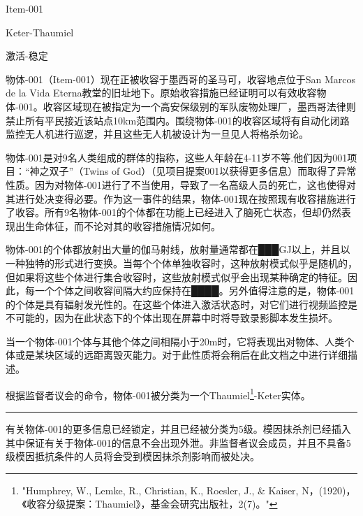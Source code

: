 Item-001

Keter-Thaumiel

激活-稳定

 物体-001（Item-001）现在正被收容于墨西哥的圣马可，收容地点位于San Marcos de la Vida Eterna教堂的旧址地下。原始收容措施已经证明可以有效收容物体-001。收容区域现在被指定为一个高安保级别的军队废物处理厂，墨西哥法律则禁止所有平民接近该站点10km范围内。围绕物体-001的收容区域将有自动化闭路监控无人机进行巡逻，并且这些无人机被设计为一旦见人将格杀勿论。



物体-001是对9名人类组成的群体的指称，这些人年龄在4-11岁不等.他们因为001项目：“神之双子”（Twins of God）（见项目提案001以获得更多信息）而取得了异常性质。因为对物体-001进行了不当使用，导致了一名高级人员的死亡，这也使得对其进行处决变得必要。作为这一事件的结果，物体-001现在按照现有收容措施进行了收容。所有9名物体-001的个体都在功能上已经进入了脑死亡状态，但却仍然表现出生命体征，而不论对其的收容措施情况如何。

物体-001的个体都放射出大量的伽马射线，放射量通常都在███GJ以上，并且以一种独特的形式进行变换。当每个个体单独收容时，这种放射模式似乎是随机的，但如果将这些个体进行集合收容时，这些放射模式似乎会出现某种确定的特征。因此，每一个个体之间收容间隔大约应保持在████。另外值得注意的是，物体-001的个体是具有辐射发光性的。在这些个体进入激活状态时，对它们进行视频监控是不可能的，因为在此状态下的个体出现在屏幕中时将导致录影脚本发生损坏。

当一个物体-001个体与其他个体之间相隔小于20m时，它将表现出对物体、人类个体或是某块区域的远距离毁灭能力。对于此性质将会稍后在此文档之中进行详细描述。

根据监督者议会的命令，物体-001被分类为一个Thaumiel\footnote{"Humphrey, W., Lemke, R., Christian, K., Roesler, J., \& Kaiser, N，(1920)，《收容分级提案：Thaumiel》，基金会研究出版社，2(7)。"}-Keter实体。

\vs\hrule

\begin{scpboxbbwm}
有关物体-001的更多信息已经锁定，并且已经被分类为5级。模因抹杀剂已经插入其中保证有关于物体-001的信息不会出现外泄。非监督者议会成员，并且不具备5级模因抵抗条件的人员将会受到模因抹杀剂影响而被处决。
\end{scpboxbbwm}

